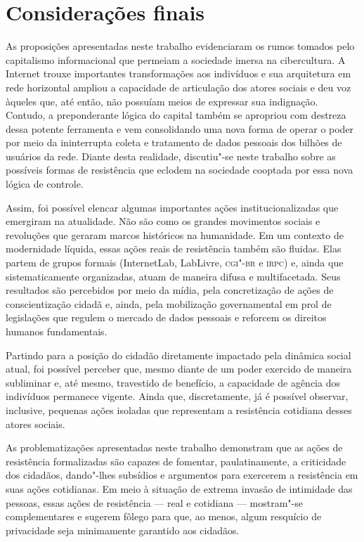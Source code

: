 \section{Considerações finais}

As proposições apresentadas neste trabalho evidenciaram os rumos tomados
pelo capitalismo informacional que permeiam a sociedade imersa na
cibercultura. A Internet trouxe importantes transformações aos
indivíduos e sua arquitetura em rede horizontal ampliou a capacidade de
articulação dos atores sociais e deu voz àqueles que, até então, não
possuíam meios de expressar sua indignação. Contudo, a preponderante
lógica do capital também se apropriou com destreza dessa potente
ferramenta e vem consolidando uma nova forma de operar o poder por meio
da ininterrupta coleta e tratamento de dados pessoais dos bilhões de
usuários da rede. Diante desta realidade, discutiu"-se neste trabalho
sobre as possíveis formas de resistência que eclodem na sociedade
cooptada por essa nova lógica de controle.

Assim, foi possível elencar algumas importantes ações
institucionalizadas que emergiram na atualidade. Não são como os grandes
movimentos sociais e revoluções que geraram marcos históricos na
humanidade. Em um contexto de modernidade líquida, essas ações reais de
resistência também são fluidas. Elas partem de grupos formais
(InternetLab, LabLivre, \textsc{cgi"-br} e \textsc{irpc}) e, ainda que sistematicamente
organizadas, atuam de maneira difusa e multifacetada. Seus resultados
são percebidos por meio da mídia, pela concretização de ações de
conscientização cidadã e, ainda, pela mobilização governamental em prol
de legislações que regulem o mercado de dados pessoais e reforcem os
direitos humanos fundamentais.

Partindo para a posição do cidadão diretamente impactado pela dinâmica
social atual, foi possível perceber que, mesmo diante de um poder
exercido de maneira subliminar e, até mesmo, travestido de benefício, a
capacidade de agência dos indivíduos permanece vigente. Ainda que,
discretamente, já é possível observar, inclusive, pequenas ações
isoladas que representam a resistência cotidiana desses atores sociais.

As problematizações apresentadas neste trabalho demonstram que as ações
de resistência formalizadas são capazes de fomentar, paulatinamente, a
criticidade dos cidadãos, dando"-lhes subsídios e argumentos para
exercerem a resistência em suas ações cotidianas. Em meio à situação de
extrema invasão de intimidade das pessoas, essas ações de resistência ---
real e cotidiana --- mostram"-se complementares e sugerem fôlego para que,
ao menos, algum resquício de privacidade seja minimamente garantido aos
cidadãos.


